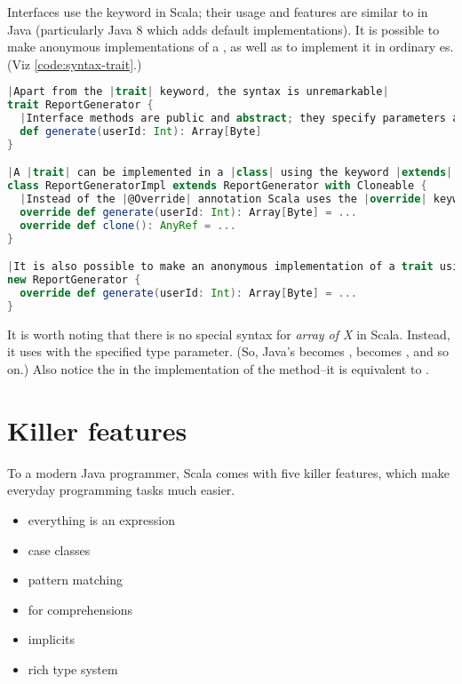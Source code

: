 \documentclass[10 pt]{article}
\begin{document}
Interfaces use the  keyword in Scala; their usage and features are similar to  in Java (particularly Java 8 which adds default implementations). It is possible to make anonymous implementations of a , as well as to implement it in ordinary es. (Viz \autoref{code:syntax-trait}.)

\begin{lstlisting}[caption={Traits}, label={code:syntax-trait}, language=Scala, escapechar=|]
|Apart from the |trait| keyword, the syntax is unremarkable|
trait ReportGenerator {
  |Interface methods are public and abstract; they specify parameters and return type|
  def generate(userId: Int): Array[Byte]
}

|A |trait| can be implemented in a |class| using the keyword |extends|. Additional traits to be implemented use the |with| keyword.|
class ReportGeneratorImpl extends ReportGenerator with Cloneable {
  |Instead of the |@Override| annotation Scala uses the |override| keyword.|
  override def generate(userId: Int): Array[Byte] = ...
  override def clone(): AnyRef = ...
}

|It is also possible to make an anonymous implementation of a trait using the |new| keyword.|
new ReportGenerator {
  override def generate(userId: Int): Array[Byte] = ...
}
\end{lstlisting}

It is worth noting that there is no special syntax for \emph{array of X} in Scala. Instead, it uses  with the specified type parameter. (So, Java's  becomes ,  becomes , and so on.) Also notice the  in the implementation of the  method--it is equivalent to .

\section{Killer features}
To a modern Java programmer, Scala comes with five killer features, which make everyday programming tasks much easier.

\begin{itemize}
  \item everything is an expression
  \item case classes
  \item pattern matching
  \item for comprehensions
  \item implicits
  \item rich type system
\end{itemize}
\end{document}

